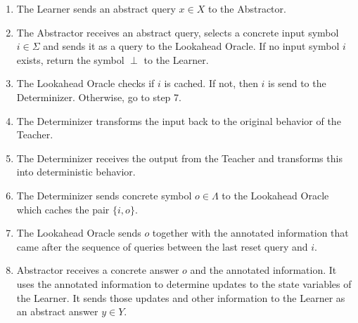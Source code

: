 \documentclass[multi,crop=false,class=article]{standalone}
\begin{document}
\begin{enumerate}
	\item The Learner sends an abstract query $x \in X$ to the Abstractor.
	\item The Abstractor receives an abstract query, selects a concrete input
	symbol $i \in \Sigma$ and sends it as a query to the Lookahead 
	Oracle. If no input symbol $i$ exists, return the symbol $\perp$ to the 
	Learner.
	\item The Lookahead Oracle checks if $i$ is cached. If not, then $i$ is send
	to the Determinizer. Otherwise, go to step 7.
	\item The Determinizer transforms the input back to the original behavior of
	the Teacher.
	\item The Determinizer receives the output from the Teacher and transforms 
	this into deterministic behavior.
	\item The Determinizer sends concrete symbol $o \in \Lambda$ to the 
	Lookahead Oracle which caches the pair $\{i,o\}$.
	\item The Lookahead Oracle sends $o$ together with the annotated information
	that came after the sequence of queries between the last reset query and
	$i$.
	\item Abstractor receives a concrete answer $o$ and the annotated
	information. It uses the annotated information to determine updates to the
	state variables of the Learner. It sends those updates and other
	information to the Learner as an abstract answer $y \in Y$.
\end{enumerate}
\end{document}
